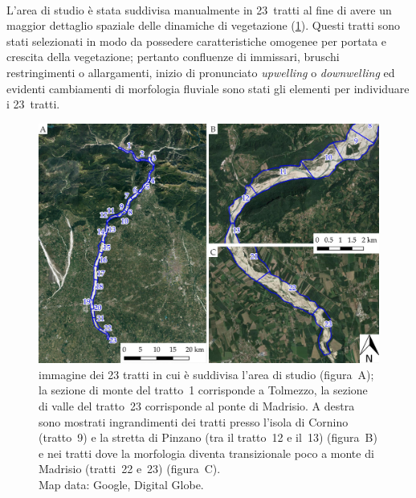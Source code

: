 %
\\
L'area di studio è stata suddivisa manualmente in 23~tratti al fine di avere un maggior dettaglio spaziale delle dinamiche di vegetazione (\cref{fig:23-tratti}). 
Questi tratti sono stati selezionati in modo da possedere caratteristiche omogenee per portata e crescita della vegetazione; 
pertanto confluenze di immissari, bruschi restringimenti o allargamenti, inizio di pronunciato \emph{upwelling} o \emph{downwelling} ed evidenti cambiamenti di morfologia fluviale sono stati gli elementi per individuare i 23~tratti.
%
\begin{figure}
	\centering
	\includegraphics[width=\textwidth]{files/tutti_23_tratti.jpeg}
	\caption[immagine dei 23 tratti in cui è suddivisa l'area di studio]{immagine dei 23 tratti in cui è suddivisa l'area di studio (figura~A); la sezione di monte del tratto~1 corrisponde a Tolmezzo, la sezione di valle del tratto~23 corrisponde al ponte di Madrisio. A destra sono mostrati ingrandimenti dei tratti presso l'isola di Cornino (tratto~9) e la stretta di Pinzano (tra il tratto~12 e il~13) (figura~B) e nei tratti dove la morfologia diventa transizionale poco a monte di Madrisio (tratti~22 e~23) (figura~C).
	\\
	Map data: Google, Digital Globe.}
	\label{fig:23-tratti}
\end{figure}


